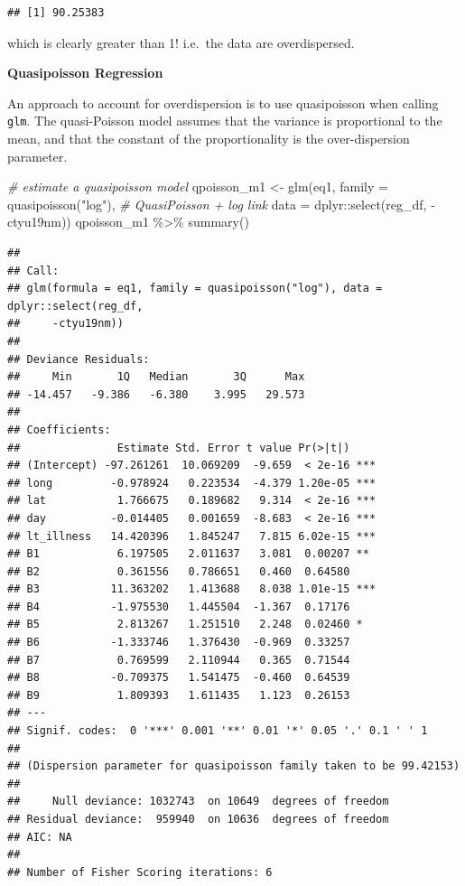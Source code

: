 \documentclass[
]{book}
\newenvironment{Shaded}{\begin{snugshade}}{\end{snugshade}}
\newcommand{\AttributeTok}[1]{\textcolor[rgb]{0.77,0.63,0.00}{#1}}
\newcommand{\CommentTok}[1]{\textcolor[rgb]{0.56,0.35,0.01}{\textit{#1}}}
\newcommand{\FunctionTok}[1]{\textcolor[rgb]{0.00,0.00,0.00}{#1}}
\newcommand{\NormalTok}[1]{#1}
\newcommand{\OtherTok}[1]{\textcolor[rgb]{0.56,0.35,0.01}{#1}}
\newcommand{\SpecialCharTok}[1]{\textcolor[rgb]{0.00,0.00,0.00}{#1}}
\newcommand{\StringTok}[1]{\textcolor[rgb]{0.31,0.60,0.02}{#1}}
\begin{document}
\begin{verbatim}
## [1] 90.25383
\end{verbatim}

which is clearly greater than 1! i.e.~the data are overdispersed.

\textbf{Quasipoisson Regression}

An approach to account for overdispersion is to use quasipoisson when calling \texttt{glm}. The quasi-Poisson model assumes that the variance is proportional to the mean, and that the constant of the proportionality is the over-dispersion parameter.

\begin{Shaded}
\begin{Highlighting}[]
\CommentTok{\# estimate a quasipoisson model}
\NormalTok{qpoisson\_m1 }\OtherTok{\textless{}{-}} \FunctionTok{glm}\NormalTok{(eq1,}
                \AttributeTok{family =} \FunctionTok{quasipoisson}\NormalTok{(}\StringTok{"log"}\NormalTok{), }\CommentTok{\# QuasiPoisson + log link}
                \AttributeTok{data =}\NormalTok{ dplyr}\SpecialCharTok{::}\FunctionTok{select}\NormalTok{(reg\_df, }\SpecialCharTok{{-}}\NormalTok{ctyu19nm))}
\NormalTok{qpoisson\_m1 }\SpecialCharTok{\%\textgreater{}\%} \FunctionTok{summary}\NormalTok{()}
\end{Highlighting}
\end{Shaded}

\begin{verbatim}
## 
## Call:
## glm(formula = eq1, family = quasipoisson("log"), data = dplyr::select(reg_df, 
##     -ctyu19nm))
## 
## Deviance Residuals: 
##     Min       1Q   Median       3Q      Max  
## -14.457   -9.386   -6.380    3.995   29.573  
## 
## Coefficients:
##               Estimate Std. Error t value Pr(>|t|)    
## (Intercept) -97.261261  10.069209  -9.659  < 2e-16 ***
## long         -0.978924   0.223534  -4.379 1.20e-05 ***
## lat           1.766675   0.189682   9.314  < 2e-16 ***
## day          -0.014405   0.001659  -8.683  < 2e-16 ***
## lt_illness   14.420396   1.845247   7.815 6.02e-15 ***
## B1            6.197505   2.011637   3.081  0.00207 ** 
## B2            0.361556   0.786651   0.460  0.64580    
## B3           11.363202   1.413688   8.038 1.01e-15 ***
## B4           -1.975530   1.445504  -1.367  0.17176    
## B5            2.813267   1.251510   2.248  0.02460 *  
## B6           -1.333746   1.376430  -0.969  0.33257    
## B7            0.769599   2.110944   0.365  0.71544    
## B8           -0.709375   1.541475  -0.460  0.64539    
## B9            1.809393   1.611435   1.123  0.26153    
## ---
## Signif. codes:  0 '***' 0.001 '**' 0.01 '*' 0.05 '.' 0.1 ' ' 1
## 
## (Dispersion parameter for quasipoisson family taken to be 99.42153)
## 
##     Null deviance: 1032743  on 10649  degrees of freedom
## Residual deviance:  959940  on 10636  degrees of freedom
## AIC: NA
## 
## Number of Fisher Scoring iterations: 6
\end{verbatim}
\end{document}
